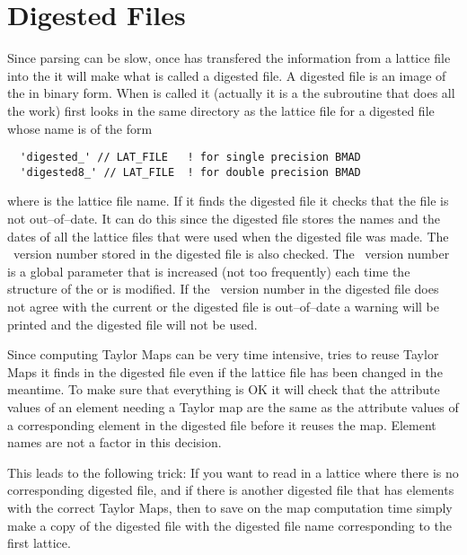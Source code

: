 \section{Digested Files}

Since parsing can be slow, once  has transfered the
information from a lattice file into the  it will make
what is called a digested file. A digested file is an image of the
 in binary form. When  is called it
(actually it is a the subroutine  that
does all the work) first looks in the same directory as the lattice
file for a digested file whose name is of the form
\begin{verbatim}
  'digested_' // LAT_FILE   ! for single precision BMAD 
  'digested8_' // LAT_FILE  ! for double precision BMAD 
\end{verbatim}
where  is the lattice file name. If it finds the digested
file it checks that the file is not out--of--date. It can do this
since the digested file stores the names and the dates of all the
lattice files that were used when the digested file was made. The
\bmad\ version number stored in the digested file is also checked. The
\bmad\ version number is a global parameter that is increased (not too
frequently) each time the structure of the  or
 is modified. If the \bmad\ version number in the
digested file does not agree with the current or the digested file is
out--of--date a warning will be printed and the digested file will not
be used.

Since computing Taylor Maps can be very time intensive,
 tries to reuse Taylor Maps it finds in the digested
file even if the lattice file has been changed in the meantime. To
make sure that everything is OK it will check that the attribute
values of an element needing a Taylor map are the same as the
attribute values of a corresponding element in the digested file
before it reuses the map. Element names are not a factor in this
decision.

This leads to the following trick: If you want to read in a lattice
where there is no corresponding digested file, and if there is another
digested file that has elements with the correct Taylor Maps, then to
save on the map computation time simply make a copy of the digested
file with the digested file name corresponding to the first lattice.


